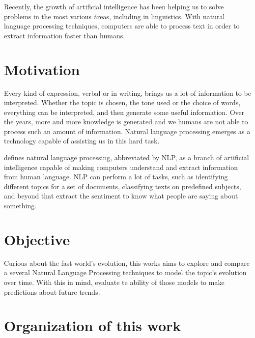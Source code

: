 Recently, the growth of artificial intelligence has been helping us to solve problems in the most various áreas, including in linguistics. With natural language processing techniques, computers are able to process text in order to extract information faster than humans.


\section{Motivation}

Every kind of expression, verbal or in writing, brings us a lot of information to be interpreted. Whether the topic is chosen, the tone used or the choice of words, everything can be interpreted, and then generate some useful information. Over the years, more and more knowledge is generated and we humans are not able to process such an amount of information. Natural language processing emerges as a technology capable of assisting us in this hard task.

 defines natural language processing, abbreviated by NLP, as a branch of artificial intelligence capable of making computers understand and extract information from human language. NLP can perform a lot of tasks, such as identifying different topics for a set of documents, classifying texts on predefined subjects, and beyond that extract the sentiment to know what people are saying about something.

% 

\section{Objective}

Curious about the fast world's evolution, this works aims to explore and compare a several Natural Language Processing techniques to model the topic's evolution over time. With this in mind, evaluate te ability of those models to make predictions about future trends.


\section{Organization of this work}

